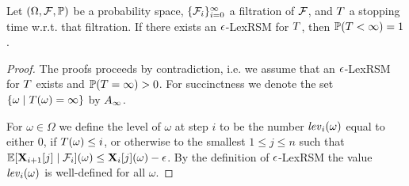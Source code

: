 \begin{theorem}
Let $(\Omega,\mathcal{F},\mathbb{P})$ be a probability space, 
$\{\mathcal{F}_i\}_{i=0}^{\infty}$ a filtration of $\mathcal{F}$, and $T$ a 
stopping 
time w.r.t. that filtration. If there exists an $\epsilon$-LexRSM for $T$, 
then $\mathbb{P}(T<\infty)=1$.
\end{theorem}
\begin{proof}
The proofs proceeds by contradiction, i.e. we assume that an $\epsilon$-LexRSM for 
$T$ exists and $\mathbb{P}(T=\infty)>0$. For succinctness we denote the 
set $\{\omega\mid T(\omega)=\infty\}$ by $A_{\infty}$.

For $\omega\in \Omega$ we define the level of $\omega$ at step $i$ to be the 
number $\mathit{lev}_{i}(\omega)$ equal to either $0$, if $T(\omega)\leq i$, 
or otherwise to the smallest $1\leq j \leq n$ such that 
$\mathbb{E}[\mathbf{X}_{i+1}[j]\mid 
\mathcal{F}_i](\omega)\leq\mathbf{X}_{i}[j](\omega)-\epsilon$. By the definition of 
$\epsilon$-LexRSM the value $\mathit{lev}_{i}(\omega)$ is well-defined for all 
$\omega$. 
% 
\end{proof}